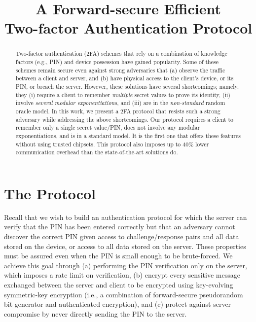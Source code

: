 \documentclass[runningheads]{llncs}
\begin{document}
\title{A Forward-secure Efficient\\ Two-factor Authentication Protocol}

\author{}
\institute{}

\maketitle  

\begin{abstract}
Two-factor authentication (2FA) schemes that rely on a combination of knowledge factors (e.g., PIN) and device possession have gained popularity. Some of these schemes remain secure even against strong adversaries that (a) observe the traffic between a client and server, and (b) have physical access to the client’s device, or its PIN, or breach the server.  However, these solutions have several shortcomings; namely, they (i) require a client to remember \emph{multiple} secret values to prove its identity, (ii) involve \emph{several modular exponentiations}, and (iii) are in the \emph{non-standard} random oracle model. In this work, we present a 2FA protocol that resists such a strong adversary while addressing the above shortcomings. Our protocol requires a client to remember only a single secret value/PIN, does not involve any modular exponentiations, and is in a standard model. It is the first one that offers these features without using trusted chipsets. This protocol also imposes up to $40\%$ lower communication overhead than the state-of-the-art solutions do. 

\end{abstract}











\section{The Protocol}\label{sec::the-protocol}

Recall that we wish to build an authentication protocol for which the server can verify that the PIN has been entered correctly but that an adversary cannot discover the correct PIN given access to challenge/response pairs and all data stored on the device, or access to all data stored on the server. 
These properties must be assured even when the PIN is small enough to be brute-forced.
We achieve this goal through (a) performing the PIN verification only on the server, which imposes a rate limit on verification, (b) encrypt every sensitive message exchanged between the server and client to be encrypted using key-evolving symmetric-key encryption (i.e., a combination of forward-secure pseudorandom bit generator and authenticated encryption), and (c) protect against server compromise by never directly sending the PIN to the server.
\end{document}
